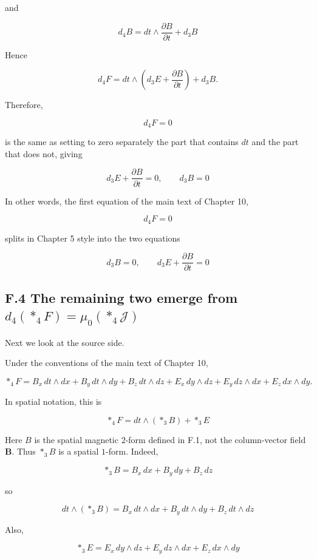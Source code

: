 and

\[
d_4B=dt\wedge\frac{\partial B}{\partial t}+d_3B
\]

Hence

\[
d_4F=dt\wedge\left(d_3E+\frac{\partial B}{\partial t}\right)+d_3B.
\]

Therefore,

\[
d_4F=0
\]

is the same as setting to zero separately the part that contains \(dt\)
and the part that does not, giving

\[
d_3E+\frac{\partial B}{\partial t}=0,
\qquad
d_3B=0
\]

In other words, the first equation of the main text of Chapter 10,

\[
d_4F=0
\]

splits in Chapter 5 style into the two equations

\[
d_3B=0,
\qquad
d_3E+\frac{\partial B}{\partial t}=0
\]

\hypertarget{f.4-the-remaining-two-emerge-from-d_4ast_4fmu_0ast_4mathcal-j}{%
\subsection{\texorpdfstring{F.4 The remaining two emerge from
\(d_4(\ast_4F)=\mu_0(\ast_4\mathcal J)\)}{F.4 The remaining two emerge from d\_4(\textbackslash ast\_4F)=\textbackslash mu\_0(\textbackslash ast\_4\textbackslash mathcal J)}}\label{f.4-the-remaining-two-emerge-from-d_4ast_4fmu_0ast_4mathcal-j}}

Next we look at the source side.

Under the conventions of the main text of Chapter 10,

\[
\ast_4F= B_x\,dt\wedge dx+B_y\,dt\wedge dy+B_z\,dt\wedge dz+E_x\,dy\wedge dz+E_y\,dz\wedge dx+E_z\,dx\wedge dy.
\]

In spatial notation, this is

\[
\ast_4F=dt\wedge(\ast_3B)+\ast_3E
\]

Here \(B\) is the spatial magnetic \(2\)-form defined in F.1, not the
column-vector field \(\mathbf{B}\). Thus \(\ast_3B\) is a spatial
\(1\)-form. Indeed,

\[
\ast_3B=B_x\,dx+B_y\,dy+B_z\,dz
\]

so

\[
dt\wedge(\ast_3B)=B_x\,dt\wedge dx+B_y\,dt\wedge dy+B_z\,dt\wedge dz
\]

Also,

\[
\ast_3E=E_x\,dy\wedge dz+E_y\,dz\wedge dx+E_z\,dx\wedge dy
\]

